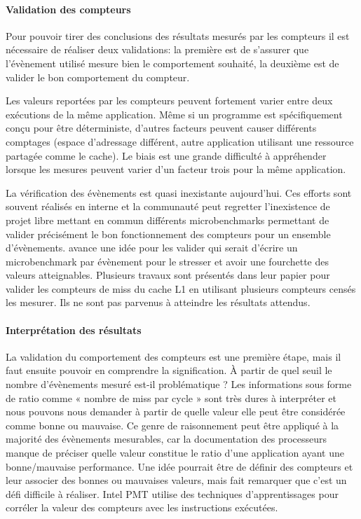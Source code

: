             
    \paragraph{Validation des compteurs}
    
        Pour pouvoir tirer des conclusions des résultats mesurés par les compteurs il est nécessaire de réaliser deux validations: la première est de s'assurer que l'évènement utilisé mesure bien le comportement souhaité, la deuxième est de valider le bon comportement du compteur.
    
        Les valeurs reportées par les compteurs peuvent fortement varier entre deux exécutions de la même application. Même si un programme est spécifiquement conçu pour être déterministe, d'autres facteurs peuvent causer différents comptages (espace d'adressage différent, autre application utilisant une ressource partagée comme le cache). Le biais est une grande difficulté à appréhender lorsque les mesures peuvent varier d'un facteur trois pour la même application.
            
        La vérification des évènements est quasi inexistante aujourd'hui. Ces efforts sont souvent réalisés en interne et la communauté \cite{Moseley2011} peut regretter l'inexistence de projet libre mettant en commun différents microbenchmarks permettant de valider précisément le bon fonctionnement des compteurs pour un ensemble d'évènements. \cite{Moseley2011} avance une idée pour les valider qui serait d'écrire un microbenchmark par évènement pour le stresser et avoir une fourchette des valeurs atteignables. Plusieurs travaux sont présentés dans leur papier pour valider les compteurs de miss du cache L1 en utilisant plusieurs compteurs censés les mesurer. Ils ne sont pas parvenus à atteindre les résultats attendus.


    \paragraph{Interprétation des résultats}
        
        La validation du comportement des compteurs est une première étape, mais il faut ensuite pouvoir en comprendre la signification. À partir de quel seuil le nombre d'évènements mesuré est-il problématique ? Les informations sous forme de ratio comme « nombre de miss par cycle » sont très dures à interpréter et nous pouvons nous demander à partir de quelle valeur elle peut être considérée comme bonne ou mauvaise. Ce genre de raisonnement peut être appliqué à la majorité des évènements mesurables, car la documentation des processeurs manque de préciser quelle valeur constitue le ratio d'une application ayant une bonne/mauvaise performance. Une idée pourrait être de définir des compteurs et leur associer des bonnes ou mauvaises valeurs, mais \cite{Moseley2011} fait remarquer que c'est un défi difficile à réaliser. Intel PMT \cite{RobertD.2011} utilise des techniques d'apprentissages pour corréler la valeur des compteurs avec les instructions exécutées.
        

